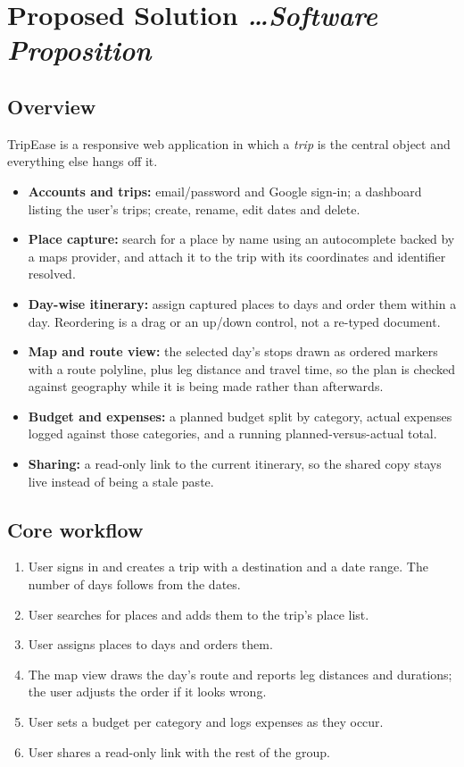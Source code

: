 \documentclass[11pt,a4paper]{article}
\newcommand{\BvrHint}[1]{%
  {\normalfont\normalsize\itshape\hfill #1}}
\begin{document}
\section{Proposed Solution %
\BvrHint{\ldots Software Proposition}}

\subsection{Overview}
TripEase is a responsive web application in which a
\emph{trip} is the central object and everything else
hangs off it.

\begin{itemize}[leftmargin=0.7cm]
    \item \textbf{Accounts and trips:} email/password
      and Google sign-in; a dashboard listing the
      user's trips; create, rename, edit dates and
      delete.
    \item \textbf{Place capture:} search for a place by
      name using an autocomplete backed by a maps
      provider, and attach it to the trip with its
      coordinates and identifier resolved.
    \item \textbf{Day-wise itinerary:} assign captured
      places to days and order them within a day.
      Reordering is a drag or an up/down control, not a
      re-typed document.
    \item \textbf{Map and route view:} the selected
      day's stops drawn as ordered markers with a route
      polyline, plus leg distance and travel time, so
      the plan is checked against geography while it is
      being made rather than afterwards.
    \item \textbf{Budget and expenses:} a planned
      budget split by category, actual expenses logged
      against those categories, and a running
      planned-versus-actual total.
    \item \textbf{Sharing:} a read-only link to the
      current itinerary, so the shared copy stays live
      instead of being a stale paste.
\end{itemize}

\subsection{Core workflow}
\begin{enumerate}[leftmargin=0.7cm]
    \item User signs in and creates a trip with a
      destination and a date range. The number of days
      follows from the dates.
    \item User searches for places and adds them to the
      trip's place list.
    \item User assigns places to days and orders them.
    \item The map view draws the day's route and
      reports leg distances and durations; the user
      adjusts the order if it looks wrong.
    \item User sets a budget per category and logs
      expenses as they occur.
    \item User shares a read-only link with the rest of
      the group.
\end{enumerate}
\end{document}
